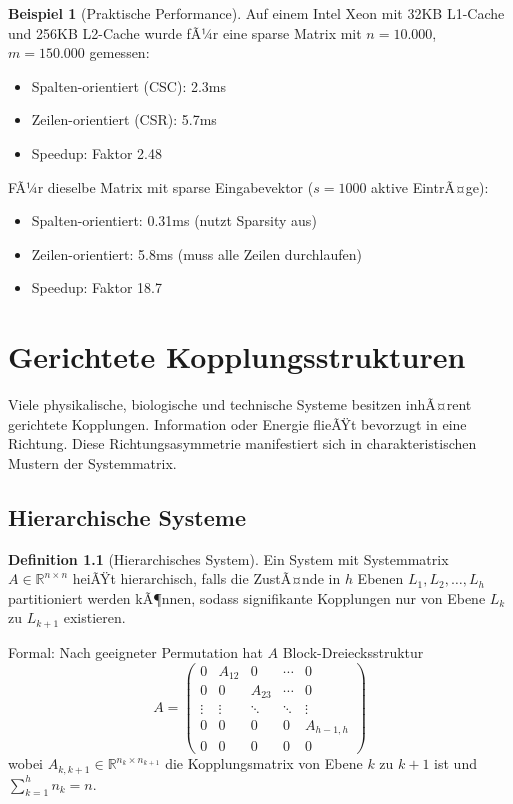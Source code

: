 ﻿\documentclass[a4paper,12pt]{report}
\theoremstyle{definition}
\newtheorem{definition}{Definition}
\newtheorem{beispiel}{Beispiel}
\begin{document}
	\begin{beispiel}[Praktische Performance]
		Auf einem Intel Xeon mit 32KB L1-Cache und 256KB L2-Cache wurde fÃ¼r eine sparse Matrix mit $n = 10.000$, $m = 150.000$ gemessen:
		\begin{itemize}
			\item Spalten-orientiert (CSC): 2.3ms
			\item Zeilen-orientiert (CSR): 5.7ms
			\item Speedup: Faktor 2.48
		\end{itemize}
		
		FÃ¼r dieselbe Matrix mit sparse Eingabevektor ($s = 1000$ aktive EintrÃ¤ge):
		\begin{itemize}
			\item Spalten-orientiert: 0.31ms (nutzt Sparsity aus)
			\item Zeilen-orientiert: 5.8ms (muss alle Zeilen durchlaufen)
			\item Speedup: Faktor 18.7
		\end{itemize}
	\end{beispiel}
	
	\chapter{Gerichtete Kopplungsstrukturen}
	
	Viele physikalische, biologische und technische Systeme besitzen inhÃ¤rent gerichtete Kopplungen. Information oder Energie flieÃŸt bevorzugt in eine Richtung. Diese Richtungsasymmetrie manifestiert sich in charakteristischen Mustern der Systemmatrix.
	
	\section{Hierarchische Systeme}
	
	\begin{definition}[Hierarchisches System]
		Ein System mit Systemmatrix $A \in \mathbb{R}^{n \times n}$ heiÃŸt hierarchisch, falls die ZustÃ¤nde in $h$ Ebenen $L_1, L_2, \ldots, L_h$ partitioniert werden kÃ¶nnen, sodass signifikante Kopplungen nur von Ebene $L_k$ zu $L_{k+1}$ existieren.
		
		Formal: Nach geeigneter Permutation hat $A$ Block-Dreiecksstruktur
		\[
		A = \begin{pmatrix}
			0 & A_{12} & 0 & \cdots & 0 \\
			0 & 0 & A_{23} & \cdots & 0 \\
			\vdots & \vdots & \ddots & \ddots & \vdots \\
			0 & 0 & 0 & 0 & A_{h-1,h} \\
			0 & 0 & 0 & 0 & 0
		\end{pmatrix}
		\]
		wobei $A_{k,k+1} \in \mathbb{R}^{n_k \times n_{k+1}}$ die Kopplungsmatrix von Ebene $k$ zu $k+1$ ist und $\sum_{k=1}^h n_k = n$.
	\end{definition}
	
\end{document}
